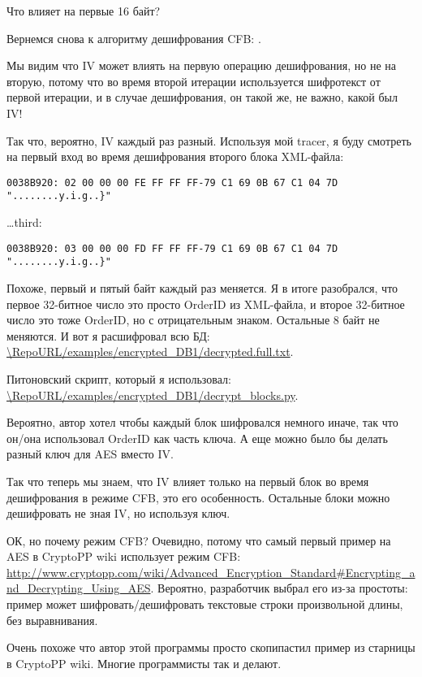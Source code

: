 Что влияет на первые 16 байт?

Вернемся снова к алгоритму дешифрования \ac{CFB}: .

Мы видим что \ac{IV} может влиять на первую операцию дешифрования, но не на вторую,
потому что во время второй итерации используется шифротекст от первой итерации, и в случае дешифрования,
он такой же, не важно, какой был \ac{IV}!

Так что, вероятно, \ac{IV} каждый раз разный.
Используя мой tracer, я буду смотреть на первый вход во время дешифрования второго блока \ac{XML}-файла:

\begin{lstlisting}
0038B920: 02 00 00 00 FE FF FF FF-79 C1 69 0B 67 C1 04 7D "........y.i.g..}"
\end{lstlisting}

\dots third:

\begin{lstlisting}
0038B920: 03 00 00 00 FD FF FF FF-79 C1 69 0B 67 C1 04 7D "........y.i.g..}"
\end{lstlisting}

Похоже, первый и пятый байт каждый раз меняется.
Я в итоге разобрался, что первое 32-битное число это просто OrderID из \ac{XML}-файла,
и второе 32-битное число это тоже OrderID, но с отрицательным знаком. Остальные 8 байт не меняются.
И вот я расшифровал всю БД:
\url{\RepoURL/examples/encrypted_DB1/decrypted.full.txt}.

Питоновский скрипт, который я использовал:
\url{\RepoURL/examples/encrypted_DB1/decrypt_blocks.py}.

Вероятно, автор хотел чтобы каждый блок шифровался немного иначе, так что он/она использовал OrderID как часть ключа.
А еще можно было бы делать разный ключ для AES вместо \ac{IV}.

Так что теперь мы знаем, что \ac{IV} влияет только на первый блок во время дешифрования в режиме \ac{CFB},
это его особенность.
Остальные блоки можно дешифровать не зная \ac{IV}, но используя ключ.

ОК, но почему режим \ac{CFB}? Очевидно, потому что самый первый пример на AES в CryptoPP wiki
использует режим \ac{CFB}:
\url{http://www.cryptopp.com/wiki/Advanced_Encryption_Standard#Encrypting_and_Decrypting_Using_AES}.
Вероятно, разработчик выбрал его из-за простоты:
пример может шифровать/дешифровать текстовые строки произвольной длины, без выравнивания.

Очень похоже что автор этой программы просто скопипастил пример из старницы в CryptoPP wiki.
Многие программисты так и делают.

